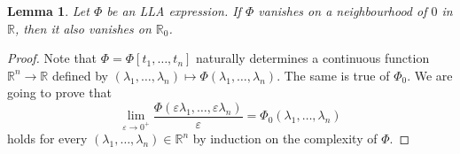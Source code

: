 \documentclass{memo-l}
\newtheorem{lem}[theorem]{Lemma}
\theoremstyle{definition}
\theoremstyle{remark}
\numberwithin{section}{chapter}
\numberwithin{equation}{chapter}
\newcommand\R{\ensuremath{\mathbb{R}}}
\begin{document}
\begin{lem}\label{lem:calc_zero_step2}
    Let $\Phi $ be an LLA expression. If $\Phi $ vanishes on a
    neighbourhood of $0$ in $\R$, then it also vanishes on $\R_0$.
\end{lem}
\begin{proof}
    Note that $\Phi =\Phi [t_1,\ldots ,t_n]$ naturally determines a
    continuous function $\R^{n}\to \R$ defined by $(\lambda _1,\ldots
    ,\lambda _n)\mapsto \Phi (\lambda _1,\ldots ,\lambda _n)$. The
    same is true of $\Phi _0$. We are going to prove that
    \begin{equation}\label{eq:lla_limit}
    \lim_{\varepsilon  \to 0^{+}}\frac{\Phi (\varepsilon \lambda
    _1,\ldots ,\varepsilon \lambda _n)}{\varepsilon }=\Phi _0 (\lambda
    _1,\ldots ,\lambda _n)
    \end{equation}
    holds for every $(\lambda _1,\ldots ,\lambda _n)\in \R^{n} $
    by induction on the complexity of $\Phi $.


\end{proof}
\end{document}
